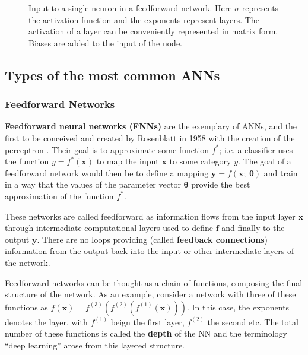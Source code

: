 \begin{figure}[h!]
  \centering
  \scalebox{1}{}
  \caption{Input to a single neuron in a feedforward network. Here $\sigma$ represents
    the activation function and the exponents represent layers. The activation of a layer
    can be conveniently represented in matrix form. Biases are added to the input of the
    node.}
  \label{fig:nn_activation}
\end{figure}


\subsection{Types of the most common ANNs}

\subsubsection{Feedforward Networks}

\textbf{Feedforward neural networks (FNNs)} are the exemplary of ANNs, and the first to be
conceived and created by Rosenblatt in 1958 with the creation of the
perceptron \cite{article:Rosenblatt1958ThePA}. Their goal is to approximate
some function $f^{*}$; i.e. a classifier uses the function
$y=f^{*}(\bm{x})$ to map the input $\bm{x}$ to some category $y$. The
goal of a feedforward network would then be to define a mapping
$\bm{y} = f(\bm{x};~\bm{\theta})$ and train in a way that the values
of the parameter vector $\bm{\theta}$ provide the best approximation of
the function $f^{*}$.

These networks are called feedforward as information flows from the input layer
$\bm{x}$ through intermediate computational layers used to define $\bm{f}$ and
finally to the output $\bm{y}$. There are no loops providing (called
\textbf{feedback connections}) information from the output back into
the input or other intermediate layers of the network.

Feedforward networks can be thought as a chain of functions, composing
the final structure of the network. As an example, consider a network
with three of these functions as $f(\bm{x}) = f^{(3)}(f^{(2)}(f^{(1)}(\bm{x})))$.
In this case, the exponents denotes the layer, with $f^{(1)}$ beign the first
layer, $f^{(2)}$ the second etc. The total number of these functions is called
the \textbf{depth} of the NN and the terminology ``deep learning'' arose from
this layered structure.

